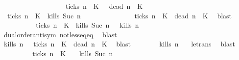 \begin{isabellebody}
\ \ \ \ \ \ \ \ \ \ \ \ \ \ \ \ \ {\isasymunion}\ {\isacharparenleft}{\isacharbraceleft}{\isasymrho}{\isachardot}\ {\isacharquery}ticks\ n\ {\isasymrho}\ K\ {\isasyminter}\ {\isacharbraceleft}{\isasymrho}{\isachardot}\ {\isacharquery}dead\ n\ {\isasymrho}\ K\isanewline
\ \ \ \ \ \ \isamarkupfalse%
\ {\isacartoucheopen}{\isasymnot}\ {\isacharquery}ticks\ n\ {\isasymrho}\ K\ {\isasymand}\ {\isacharquery}kills\ {\isacharparenleft}Suc\ n{\isacharparenright}\ {\isasymrho}\isanewline
\ \ \ \ \ \ \ \ \ \ \ \ \ {\isasymor}\ {\isacharquery}ticks\ n\ {\isasymrho}\ K\ {\isasymand}\ {\isacharquery}dead\ n\ {\isasymrho}\ K\ \isamarkupfalse%
\ blast\isanewline
\ \ \ \ \ \ \isamarkupfalse%
\ \isamarkupfalse%
\ {\isacartoucheopen}{\isacharparenleft}{\isacharparenleft}{\isasymnot}\ {\isacharquery}ticks\ n\ {\isasymrho}\ K\ {\isasymand}\ {\isacharparenleft}{\isacharquery}kills\ {\isacharparenleft}Suc\ n{\isacharparenright}\ {\isasymrho}{\isacharparenright}{\isacharparenright}\ {\isasymlongrightarrow}\ {\isacharquery}kills\ n\ {\isasymrho}{\isacartoucheclose}\isanewline
\ \ \ \ \ \ \ \ \isamarkupfalse%
\ dual{\isacharunderscore}order{\isachardot}antisym\ not{\isacharunderscore}less{\isacharunderscore}eq{\isacharunderscore}eq\ \isamarkupfalse%
\ blast\isanewline
\ \ \ \ \ \ \isamarkupfalse%
\ \isamarkupfalse%
\ {\isacartoucheopen}{\isacharquery}kills\ n\ {\isasymrho}\ {\isasymor}\ {\isacharquery}ticks\ n\ {\isasymrho}\ K\ {\isasymand}\ {\isacharquery}dead\ n\ {\isasymrho}\ K\ \isamarkupfalse%
\ blast\isanewline
\ \ \ \ \ \ \isamarkupfalse%
\ {\isacartoucheopen}{\isacharquery}kills\ n\ {\isasymrho}{\isacartoucheclose}\ \isamarkupfalse%
\ le{\isacharunderscore}trans\ \isamarkupfalse%
\ blast\isanewline
\ \ \ \ \isacommand{{\isacharbraceright}}\isamarkupfalse%
\ \isamarkupfalse%
\ {\isacartoucheopen}{\isacharparenleft}{\isacharbraceleft}{\isasymrho}{\isachardot}\ {\isasymnot}\ {\isacharquery}ticks\ n\ {\isasymrho}\ K\ \ {\isasyminter}\ {\isacharbraceleft}{\isasymrho}{\isachardot}\ {\isacharquery}kills\ {\isacharparenleft}Suc\ n{\isacharparenright}\ {\isasymrho}{\isacharbraceright}{\isacharparenright}\isanewline

\end{isabellebody}
